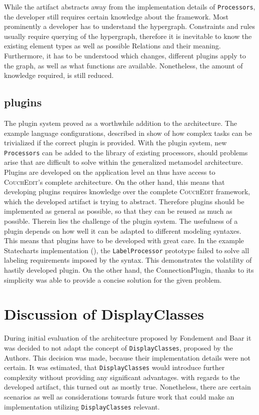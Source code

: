 While the artifact abstracts away from the implementation details of \texttt{Processors}, the developer still requires certain knowledge about the framework. Most prominently a developer has to understand the hypergraph. Constraints and rules usually require querying of the hypergraph, therefore it is inevitable to know the existing element types as well as possible Relations and their meaning. Furthermore, it has to be understood which changes, different plugins apply to the graph, as well as what functions are available. Nonetheless, the amount of knowledge required, is still reduced.   

\subsection{plugins}
The plugin system proved as a worthwhile addition to the architecture. The example language configurations, described in  show of how complex tasks can be trivialized if the correct plugin is provided. With the plugin system, new \texttt{Processors} can be added to the library of existing processors, should problems arise that are difficult to solve within the generalized metamodel architecture. Plugins are developed on the application level an thus have access to \textsc{CouchEdit}'s complete architecture. On the other hand, this means that developing plugins requires knowledge over the complete \textsc{CouchEdit} framework, which the developed artifact is trying to abstract. Therefore plugins should be implemented as general as possible, so that they can be reused as much as possible. Therein lies the challenge of the plugin system. The usefulness of a plugin depends on how well it can be adapted to different modeling syntaxes. This means that plugins have to be developed with great care. In the example Statecharts implementation (), the \texttt{LabelProcessor} prototype failed to solve all labeling requirements imposed by the syntax. This demonstrates the volatility of hastily developed plugin. On the other hand, the ConnectionPlugin, thanks to its simplicity was able to provide a concise solution for the given problem.

\section{Discussion of DisplayClasses}
During initial evaluation of the architecture proposed by Fondement and Baar \cite{fondement_making_2005} it was decided to not adapt the concept of \texttt{DisplayClasses}, proposed by the Authors. This decision was made, because their implementation details were not certain. It was estimated, that \texttt{DisplayClasses} would introduce further complexity without providing any significant advantages. with regards to the developed artifact, this turned out as mostly true. Nonetheless, there are certain scenarios as well as considerations towards future work that could make an implementation utilizing \texttt{DisplayClasses} relevant.  

